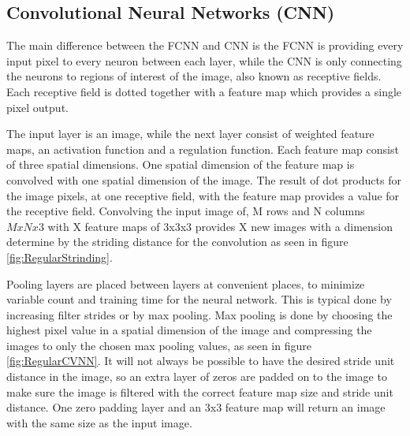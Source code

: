 \FloatBarrier

\subsection{Convolutional Neural Networks (CNN)}

The main difference between the FCNN and CNN is the FCNN is providing every input pixel to every neuron between each layer, while the CNN is only connecting the neurons to regions of interest of the image, also known as receptive fields. Each receptive field is dotted together with a feature map which provides a single pixel output.

The input layer is an image, while the next layer consist of weighted feature maps, an activation function and a regulation function. Each feature map consist of three spatial dimensions. One spatial dimension of the feature map is convolved with one spatial dimension of the image. The result of dot products for the image pixels, at one receptive field, with the feature map provides a value for the receptive field. Convolving the input image of, M rows and N columns $MxNx3$ with X feature maps of 3x3x3 provides X new images with a dimension determine by the striding distance for the convolution as seen in figure \ref{fig:RegularStrinding}.

\FloatBarrier

Pooling layers are placed between layers at convenient places, to minimize variable count and training time for the neural network. This is typical done by increasing filter strides or by max pooling. Max pooling is done by choosing the highest pixel value in a spatial dimension of the image and compressing the images to only the chosen max pooling values, as seen in figure \ref{fig:RegularCVNN}. It will not always be possible to have the desired stride unit distance in the image, so an extra layer of zeros are padded on to the image to make sure the image is filtered with the correct feature map size and stride unit distance. One zero padding layer and an 3x3 feature map will return an image with the same size as the input image.

\FloatBarrier